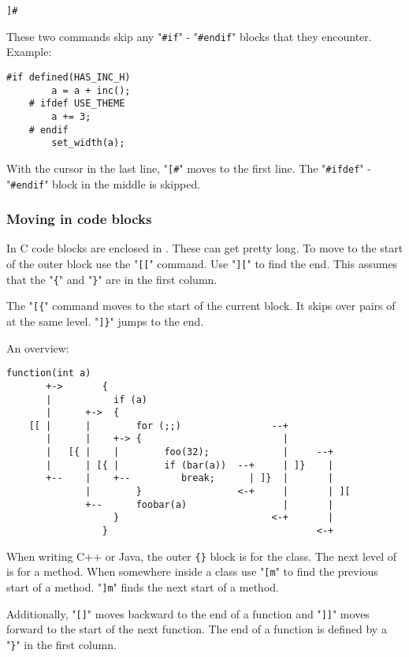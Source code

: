 \begin{Verbatim}[samepage=true]
 ]#
\end{Verbatim}

These two commands skip any "\verb!#if!" - "\verb!#endif!" blocks that they encounter.
Example:

\begin{Verbatim}[samepage=true]
    #if defined(HAS_INC_H) 
        a = a + inc(); 
    # ifdef USE_THEME 
        a += 3; 
    # endif 
        set_width(a); 
\end{Verbatim}

With the cursor in the last line, "\verb![#!" moves to the first line.
The "\verb!#ifdef!" - "\verb!#endif!" block in the middle is skipped.
\subsubsection{Moving in code blocks}
In C code blocks are enclosed in {}.
These can get pretty long.
To move to the start of the outer block use the "\verb![[!" command.
Use "\verb!][!" to find the end.
This assumes that the "\verb!{!" and "\verb!}!" are in the first column.

The "\verb![{!" command moves to the start of the current block.
It skips over pairs of {} at the same level.
"\verb!]}!" jumps to the end.

An overview:

\begin{Verbatim}[samepage=true]
                 function(int a)
       +->       {
       |           if (a)
       |      +->  {
    [[ |      |        for (;;)                --+
       |      |    +-> {                         |
       |   [{ |    |        foo(32);             |     --+
       |      | [{ |        if (bar(a))  --+     | ]}    |
       +--    |    +--         break;      | ]}  |       |
              |        }                 <-+     |       | ][
              +--      foobar(a)                 |       |
                   }                           <-+       |
                 }                                     <-+
\end{Verbatim}

When writing C++ or Java, the outer \verb!{}! block is for the class.
The next level of {} is for a method.
When somewhere inside a class use "\verb![m!" to find the previous start of a method.
"\verb!]m!" finds the next start of a method.

Additionally, "\verb![]!" moves backward to the end of a function and "\verb!]]!" moves forward to the start of the next function.
The end of a function is defined by a "\verb!}!" in the first column.

